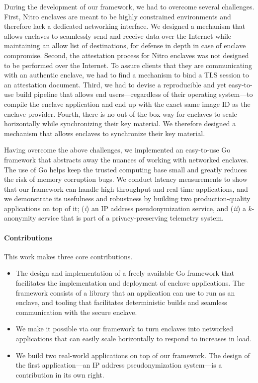 During the development of our framework, we had to overcome several challenges.
First, Nitro enclaves are meant to be highly constrained environments and
therefore lack a dedicated networking interface.  We designed a mechanism that
allows enclaves to seamlessly send and receive data over the Internet while
maintaining an allow list of destinations, for defense in depth in case of
enclave compromise.
%
Second, the attestation process for Nitro enclaves was not designed to be
performed over the Internet.  To assure clients that they are communicating with
an authentic enclave, we had to find a mechanism to bind a TLS session to an
attestation document.
%
Third, we had to devise a reproducible and yet easy-to-use build pipeline that
allows end users---regardless of their operating system---to compile the enclave
application and end up with the exact same image ID as the enclave provider.
%
Fourth, there is no out-of-the-box way for enclaves to scale horizontally while
synchronizing their key material.  We therefore designed a mechanism that allows
enclaves to synchronize their key material.

Having overcome the above challenges, we implemented an easy-to-use Go framework
that abstracts away the nuances of working with networked enclaves.  The use of
Go helps keep the trusted computing base small and greatly reduces the risk of
memory corruption bugs.  We conduct latency measurements to show that our
framework can handle high-throughput and real-time applications, and we
demonstrate its usefulness and robustness by building two production-quality
applications on top of it; (\emph{i}) an IP address pseudonymization service,
and (\emph{ii}) a $k$-anonymity service that is part of a privacy-preserving
telemetry system.

\paragraph{Contributions}

This work makes three core contributions.

\begin{itemize}
  \item The design and implementation of a freely available Go framework that
    facilitates the implementation and deployment of enclave applications.  The
    framework consists of a library that an application can use to run as an
    enclave, and tooling that facilitates deterministic builds and seamless
    communication with the secure enclave.

  \item We make it possible via our framework to turn enclaves into networked
    applications that can easily scale horizontally to respond to increases in
    load.

  \item We build two real-world applications on top of our framework.  The
    design of the first application---an IP address pseudonymization system---is
    a contribution in its own right.
\end{itemize}

